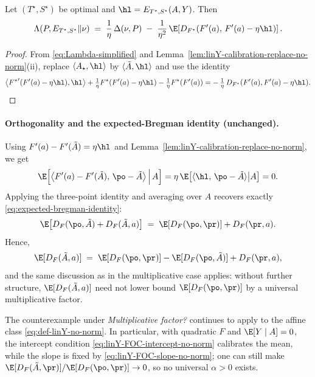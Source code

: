 \begin{lemma}
    \label{lem:linY-optimized-Lambda-no-norm}
    Let $(T^\star,S^\star)$ be optimal and $\hl=E_{T^\star,S^\star}(A,Y)$. Then
    \begin{equation}
        \Lambda(P,E_{T^\star,S^\star}\Vert \nu)
        \;=\;
        \frac{1}{\eta}\,\Delta(\nu,P)
        \;-\;
        \frac{1}{\eta^2}\,
        \E\!\left[
            D_{F^\star}\!\left(F'(a),\,F'(a)-\eta \hl\right)
            \right].
        \label{eq:linY-optimized-Lambda-no-norm}
    \end{equation}
\end{lemma}

\begin{proof}
    From \eqref{eq:Lambda-simplified} and
    Lemma~\ref{lem:linY-calibration-replace-no-norm}(ii),
    replace $\langle A_\star,\hl\rangle$ by $\langle \tilde{A},\hl\rangle$ and use
    the identity
    \[
        \big\langle {F^\star}'(F'(a)-\eta\hl),\hl\big\rangle
        +\tfrac{1}{\eta}F^\star(F'(a)-\eta\hl) - \tfrac{1}{\eta}F^\star(F'(a))
        = -\,\tfrac{1}{\eta}\,D_{F^\star}(F'(a),F'(a)-\eta\hl).
    \]
\end{proof}

\paragraph{Orthogonality and the expected-Bregman identity (unchanged).}
Using $F'(a)-F'(\tilde{A})=\eta \hl$ and
Lemma~\ref{lem:linY-calibration-replace-no-norm}, we get
\[
    \E\!\left[
        \big\langle F'(a)-F'(\tilde{A}),\, \po-\tilde{A}\big\rangle
        \,\Big|\, A
        \right]
    = \eta\,\E\!\left[\langle \hl,\, \po-\tilde{A}\rangle \big| A\right]
    = 0.
\]
Applying the three-point identity and averaging over $A$ recovers exactly
\eqref{eq:expected-bregman-identity}:
\begin{equation}
    \E\!\left[D_F(\po,\tilde{A}) + D_F(\tilde{A},a)\right]
    \;=\;
    \E\!\left[D_F(\po,\pr)\right] + D_F(\pr,a).
    \label{eq:expected-bregman-identity-linY-no-norm}
\end{equation}
Hence,
\[
    \E[D_F(\tilde{A},a)]
    \;=\;
    \E[D_F(\po,\pr)] - \E[D_F(\po,\tilde{A})] + D_F(\pr,a),
\]
and the same discussion as in the multiplicative case applies: without further
structure, $\E[D_F(\tilde{A},a)]$ need not lower bound
$\E[D_F(\po,\pr)]$ by a universal multiplicative factor.

\begin{corollary}
    \label{cor:no-alpha-linY-no-norm}
    The counterexample under \emph{Multiplicative factor?} continues to apply to the
    affine class \eqref{eq:def-linY-no-norm}.  In particular, with quadratic $F$
    and $\E[Y\mid A]=0$, the intercept condition
    \eqref{eq:linY-FOC-intercept-no-norm} calibrates the mean, while the slope is
    fixed by \eqref{eq:linY-FOC-slope-no-norm}; one can still make
    $\E[D_F(\tilde{A},\pr)]/\E[D_F(\po,\pr)]\to 0$, so no universal $\alpha>0$
    exists.
\end{corollary}

